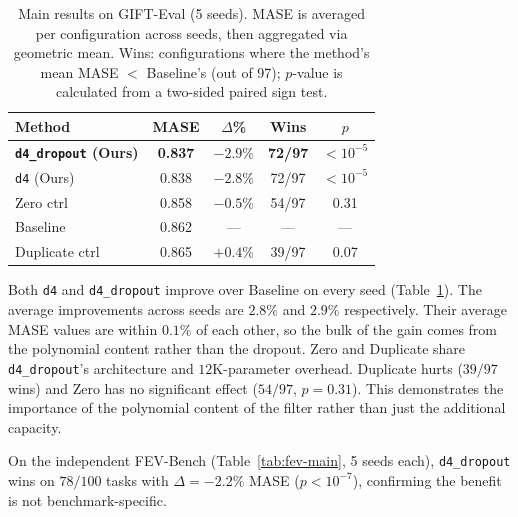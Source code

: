 \documentclass{article}
\begin{document}
\begin{table}[t]
\caption{Main results on GIFT-Eval (5 seeds). MASE is averaged per configuration across seeds, then aggregated via geometric mean. Wins: configurations where the method's mean MASE $<$ Baseline's (out of 97); $p$-value is calculated from a two-sided paired sign test.}
\label{tab:main}
\vskip 0.1in
\centering
\begin{small}
\setlength{\tabcolsep}{3pt}
\begin{tabular}{lcccc}
\toprule
\textbf{Method} & \textbf{MASE} & \textbf{$\Delta$\%} & \textbf{Wins} & \textbf{$p$} \\
\midrule
\textbf{\texttt{d4\_dropout} (Ours)} & \textbf{0.837} & \textbf{$-2.9\%$} & \textbf{72/97} & $< 10^{-5}$ \\
\texttt{d4} (Ours)         & 0.838          & $-2.8\%$       & 72/97 & $< 10^{-5}$ \\
Zero ctrl                  & 0.858          & $-0.5\%$       & 54/97 & 0.31 \\
Baseline                   & 0.862          & ---            & ---   & --- \\
Duplicate ctrl             & 0.865          & $+0.4\%$       & 39/97 & 0.07 \\
\bottomrule
\end{tabular}
\end{small}
\vskip -0.1in
\end{table}

Both \texttt{d4} and \texttt{d4\_dropout} improve over Baseline on every seed (Table~\ref{tab:main}). The average improvements across seeds are $2.8\%$ and $2.9\%$ respectively. Their average MASE values are within $0.1\%$ of each other, so the bulk of the gain comes from the polynomial content rather than the dropout. Zero and Duplicate share \texttt{d4\_dropout}'s architecture and $12$K-parameter overhead. Duplicate hurts ($39/97$ wins) and Zero has no significant effect ($54/97$, $p = 0.31$). This demonstrates the importance of the polynomial content of the filter rather than just the additional capacity.

On the independent FEV-Bench (Table~\ref{tab:fev-main}, 5 seeds each), \texttt{d4\_dropout} wins on $78/100$ tasks with $\Delta = -2.2\%$ MASE ($p < 10^{-7}$), confirming the benefit is not benchmark-specific.
\end{document}
